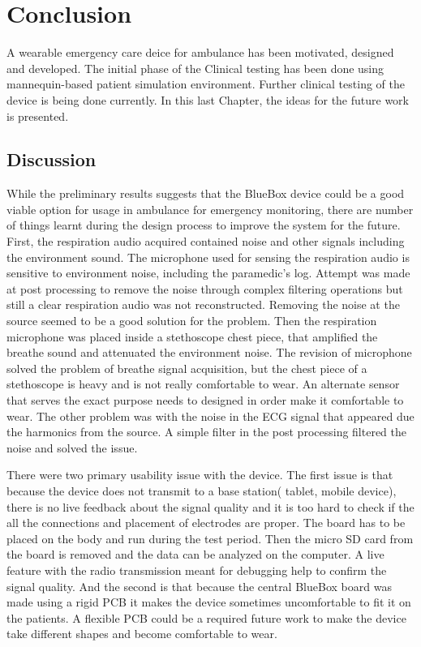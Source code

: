\chapter{Conclusion}
A wearable emergency care deice for ambulance has been motivated, designed and developed. The initial phase of the Clinical testing has been done using mannequin-based patient simulation environment. Further clinical testing of the device is being done currently. In this last Chapter, the ideas for the future work is presented.

\section{Discussion}
While the preliminary results suggests that the BlueBox device could be a good viable option for usage in ambulance for emergency monitoring, there are number of things  learnt during the design process to improve the system for the future. First, the respiration audio acquired contained noise and other signals including the environment sound. The microphone used for sensing the respiration audio is sensitive to environment noise, including the paramedic's log. Attempt was made at post processing to remove the noise through complex filtering operations but still a clear respiration audio was not reconstructed. Removing the noise at the source seemed to be a good solution for the problem. Then the respiration microphone was placed inside a stethoscope chest piece, that amplified the breathe sound and attenuated the environment noise. The revision of microphone solved the problem of breathe signal acquisition, but the chest piece of a stethoscope is heavy and is not really comfortable to wear. An alternate sensor that serves the exact purpose needs to designed in order make it comfortable to wear. The other problem was with the noise in the ECG signal that appeared due the harmonics from the source. A simple filter in the post processing filtered the noise and solved the issue. 

There were two primary usability issue with the device. The first issue is that because the device does not transmit to a base station( tablet, mobile device), there is no live feedback about the signal quality and it is too hard to check if the all the connections and placement of electrodes are proper. The board has to be placed on the body and run during the test period. Then the micro SD card from the board is removed and the data can be analyzed on the computer. A live feature with the radio transmission meant for debugging help to confirm the signal quality. And the second is that because the central BlueBox board was made using a rigid PCB it makes the device sometimes uncomfortable to fit it on the patients. A flexible PCB could be a required future work to make the device take different shapes and become comfortable to wear. 

